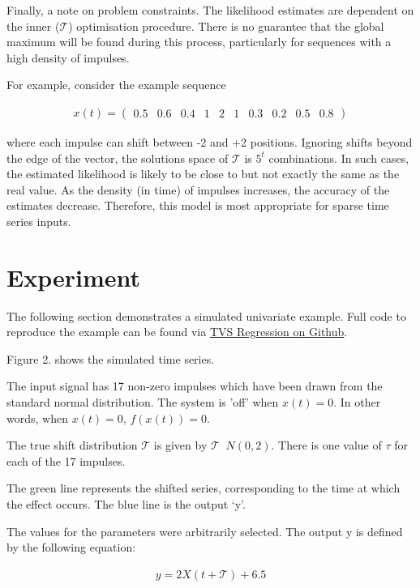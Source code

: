\documentclass[11pt]{amsart}
\begin{document}
Finally, a note on problem constraints. The likelihood estimates are dependent on the inner ($\mathcal{T}$) optimisation procedure. There is no guarantee that the global maximum will be found during this process, particularly for sequences with a high density of impulses. 

For example, consider the example sequence 

\begin{align}
    x(t) = 
    \left(
\begin{array}{cccccccccc}
    0.5 & 0.6 & 0.4 & 1 & 2 & 1 &
    0.3 & 0.2 & 0.5 & 0.8 
\end{array}  
\right)
\end{align}

where each impulse can shift between -2 and +2 positions. Ignoring shifts beyond the edge of the vector, the solutions space of $\mathcal{T}$ is $5^t$ combinations.  
In such cases, the estimated likelihood is likely to be close to but not exactly the same as the real value. As the density (in time) of impulses increases, the accuracy of the estimates decrease. Therefore, this model is most appropriate for sparse time series inputs.

\section{Experiment}

The following section demonstrates a simulated univariate example. Full code to reproduce the example can be found via \href{https://github.com/aaron1rcl/tvs_regression/}{TVS Regression on Github}.

Figure 2. shows the simulated time series.

The input signal has 17 non-zero impulses which have been drawn from the standard normal distribution. The system is 'off' when $x(t) =0$. In other words, when $x(t) = 0$, $f(x(t)) = 0$. 

The true shift distribution $\mathcal{T}$ is given by $\mathcal{T}$ $~ N(0, 2)$. There is one value of $\tau$ for each of the 17 impulses.

The green line represents the shifted series, corresponding to the time at which the effect occurs. The blue line is the output ‘y’.

The values for the parameters were arbitrarily selected. The output y is defined by the following equation:


\begin{align}
    y = 2X(t + \mathcal{T}) + 6.5
\end{align}
\end{document}
